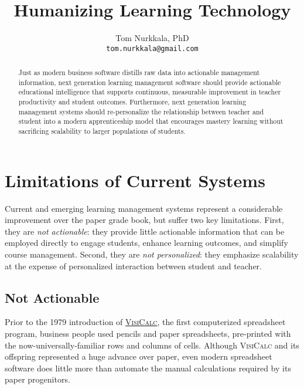 \documentclass{article}
\title{Humanizing Learning Technology}
\author{Tom Nurkkala, PhD\\\texttt{tom.nurkkala@gmail.com}}
\newcommand{\vcalc}{\textsc{VisiCalc}}
\begin{document}
\maketitle

\begin{abstract}
  Just as modern business software
  distills raw data into actionable management information,
  next generation learning management software
  should provide actionable educational intelligence
  that supports continuous, measurable improvement
  in teacher productivity and student outcomes.
  Furthermore, next generation learning management systems
  should re-personalize the relationship between teacher and student
  into a modern apprenticeship model
  that encourages mastery learning
  without sacrificing scalability
  to larger populations of students.
\end{abstract}




\section{Limitations of Current Systems}
\label{sec:limitations}

Current and emerging learning management systems
represent a considerable improvement over the paper grade book,
but suffer two key limitations.
First,
they are \emph{not actionable}:
they provide little actionable information
that can be employed directly to engage students,
enhance learning outcomes,
and simplify course management.
Second,
they are \emph{not personalized}:
they emphasize scalability
at the expense of personalized interaction
between student and teacher.

\subsection{Not Actionable}
\label{sec:not-actionable}

Prior to the 1979 introduction
of \href{https://en.wikipedia.org/wiki/VisiCalc}{\vcalc{}},
the first computerized spreadsheet program,
business people used pencils and paper spreadsheets,
pre-printed with the now-universally-familiar rows and columns of cells.
Although \vcalc{} and its offspring
represented a huge advance over paper,
even modern spreadsheet software does little more
than automate the manual calculations
required by its paper progenitors.
\end{document}
